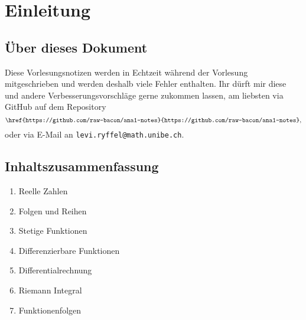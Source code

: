 \documentclass[../main.tex]{subfiles}
\begin{document}
\chapter*{Einleitung}
\section*{Über dieses Dokument}
Diese Vorlesungsnotizen werden in Echtzeit während der Vorlesung mitgeschrieben
und werden deshalb viele Fehler enthalten.
Ihr dürft mir diese und andere Verbesserungsvorschläge
gerne zukommen lassen, am liebsten via GitHub
auf dem Repository
\[
\texttt{\href{https://github.com/raw-bacon/ana1-notes}{https://github.com/raw-bacon/ana1-notes}},
\]
oder via E-Mail an \texttt{levi.ryffel@math.unibe.ch}.

\section*{Inhaltszusammenfassung}
\begin{enumerate}
  \item Reelle Zahlen
  \item Folgen und Reihen
  \item Stetige Funktionen
  \item Differenzierbare Funktionen
  \item Differentialrechnung
  \item Riemann Integral
  \item Funktionenfolgen
\end{enumerate}
\end{document}

